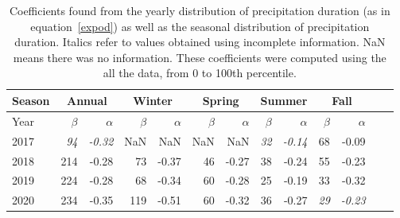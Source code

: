 \begin{table}[bh]
  \begin{center}
    \begin{tabular}{|l|*{11}{r|}r|}
      \hline
      Season    &       \multicolumn{2}{|c|}{Annual}          & \multicolumn{2}{|c|}{Winter}& \multicolumn{2}{|c|}{Spring}  & \multicolumn{2}{|c|}{Summer} &\multicolumn{2}{|c|}{Fall}  \\
      \hline
      Year      & $\beta $ & $\alpha$  & $\beta $ & $\alpha$ & $\beta $ & $\alpha$ & $\beta $ & $\alpha$ & $\beta $ & $\alpha$\\
      \hline
      2017      & \textit{94}  & \textit{-0.32}  & NaN & NaN & NaN & NaN & \textit{32}  & \textit{-0.14}  & 68  & -0.09  \\
      2018      & 214           & -0.28  & 73 & -0.37 & 46 & -0.27 & 38  & -0.24  & 55 & -0.23  \\
      2019      & 224          & -0.28  & 68  & -0.34 & 60 & -0.28 & 25 & -0.19  & 33 &  -0.32 \\
      2020      & 234           & -0.35   & 119  & -0.51 & 60  & -0.32 & 36  & -0.27 & \textit{29} & \textit{-0.23}\\
      \hline
    \end{tabular}
  \end{center}
\caption[Year comparison of coefficients of precipitation duration up 
  to its 100th percentile]{\label{firsttable_100} Coefficients found from the
  yearly distribution of precipitation duration (as in equation~\ref{expod})
  as well as the seasonal distribution of precipitation duration. Italics
  refer to values obtained using incomplete information. NaN means there was
  no information. These coefficients were computed using the all the data,
  from 0 to 100th percentile.}
\end{table}

